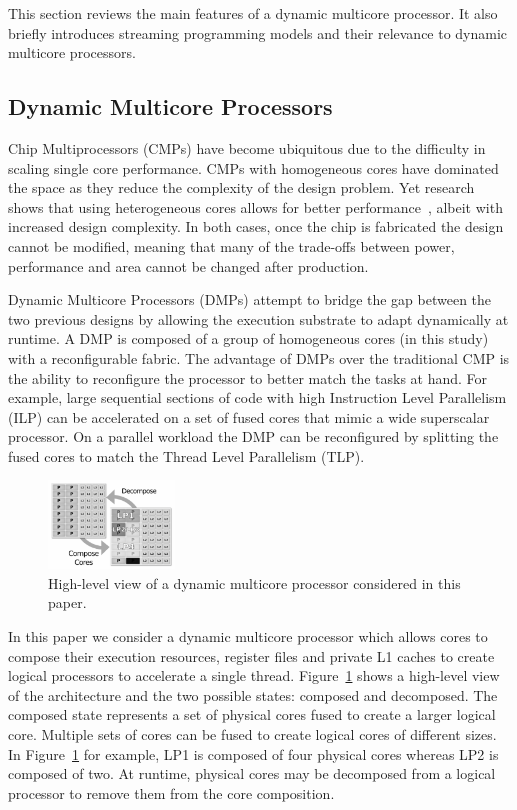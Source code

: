 This section reviews the main features of a dynamic multicore processor.
It also  briefly introduces streaming programming models and their relevance to dynamic multicore processors.

\subsection{Dynamic Multicore Processors}


Chip Multiprocessors (CMPs) have become ubiquitous due to the difficulty in scaling single core performance.
CMPs with homogeneous cores have dominated the space as they reduce the complexity of the design problem.
Yet research shows that using heterogeneous cores allows for better performance~\cite{suleman2009asymmetric}, albeit with increased design complexity. 
In both cases, once the chip is fabricated the design cannot be modified, meaning that many of the trade-offs between power, performance and area cannot be changed after production.

Dynamic Multicore Processors (DMPs) attempt to bridge the gap between the two previous designs by allowing the execution substrate to adapt dynamically at runtime.
A DMP is composed of a group of homogeneous cores (in this study) with a reconfigurable fabric.
The advantage of DMPs over the traditional CMP is the ability to reconfigure the processor to better match the tasks at hand.
For example, large sequential sections of code with high Instruction Level Parallelism (ILP) can be accelerated on a set of fused cores that mimic a wide superscalar processor.
On a parallel workload the DMP can be reconfigured by splitting the fused cores to match the Thread Level Parallelism (TLP).

\begin{figure}[t]
    \centering
    \includegraphics[width=0.3\textwidth]{graphics/dmcgraph.pdf}
    \caption{High-level view of a dynamic multicore processor considered in this paper.}
    \label{fig:dynmulticore}
\end{figure}

In this paper we consider a dynamic multicore processor which allows cores to compose their execution resources, register files and private L1 caches to create logical processors to accelerate a single thread.
Figure~\ref{fig:dynmulticore} shows a high-level view of the architecture and the two possible states: composed and decomposed.
The composed state represents a set of physical cores fused to create a larger logical core.
Multiple sets of cores can be fused to create logical cores of different sizes.
In Figure~\ref{fig:dynmulticore} for example, LP1 is composed of four physical cores whereas LP2 is composed of two.
At runtime, physical cores may be decomposed from a logical processor to remove them from the core composition.

